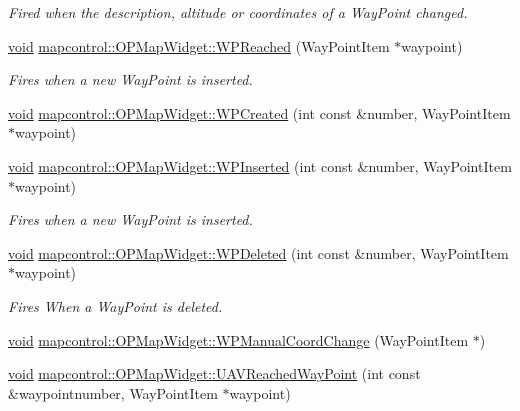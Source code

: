 \begin{DoxyCompactItemize}
\begin{DoxyCompactList}\small\item\em \-Fired when the description, altitude or coordinates of a \-Way\-Point changed. \end{DoxyCompactList}\item 
\hyperlink{group___u_a_v_objects_plugin_ga444cf2ff3f0ecbe028adce838d373f5c}{void} \hyperlink{group___o_p_map_widget_gace0e66a97e422c30b79aed508d0be81d}{mapcontrol\-::\-O\-P\-Map\-Widget\-::\-W\-P\-Reached} (\-Way\-Point\-Item $\ast$waypoint)
\begin{DoxyCompactList}\small\item\em \-Fires when a new \-Way\-Point is inserted. \end{DoxyCompactList}\item 
\hyperlink{group___u_a_v_objects_plugin_ga444cf2ff3f0ecbe028adce838d373f5c}{void} \hyperlink{group___o_p_map_widget_ga76a7138d7fd9e231e80d00430c349d03}{mapcontrol\-::\-O\-P\-Map\-Widget\-::\-W\-P\-Created} (int const \&number, \-Way\-Point\-Item $\ast$waypoint)
\item 
\hyperlink{group___u_a_v_objects_plugin_ga444cf2ff3f0ecbe028adce838d373f5c}{void} \hyperlink{group___o_p_map_widget_gaacb4d7f71ed1c2874106d276563e1348}{mapcontrol\-::\-O\-P\-Map\-Widget\-::\-W\-P\-Inserted} (int const \&number, \-Way\-Point\-Item $\ast$waypoint)
\begin{DoxyCompactList}\small\item\em \-Fires when a new \-Way\-Point is inserted. \end{DoxyCompactList}\item 
\hyperlink{group___u_a_v_objects_plugin_ga444cf2ff3f0ecbe028adce838d373f5c}{void} \hyperlink{group___o_p_map_widget_ga27de44a330cf3ee63827db0c562f7bb8}{mapcontrol\-::\-O\-P\-Map\-Widget\-::\-W\-P\-Deleted} (int const \&number, \-Way\-Point\-Item $\ast$waypoint)
\begin{DoxyCompactList}\small\item\em \-Fires \-When a \-Way\-Point is deleted. \end{DoxyCompactList}\item 
\hyperlink{group___u_a_v_objects_plugin_ga444cf2ff3f0ecbe028adce838d373f5c}{void} \hyperlink{group___o_p_map_widget_gac6d662e318e008a70747a8d26b971a3a}{mapcontrol\-::\-O\-P\-Map\-Widget\-::\-W\-P\-Manual\-Coord\-Change} (\-Way\-Point\-Item $\ast$)
\item 
\hyperlink{group___u_a_v_objects_plugin_ga444cf2ff3f0ecbe028adce838d373f5c}{void} \hyperlink{group___o_p_map_widget_ga532ae30a356e865120c460f345a4ab65}{mapcontrol\-::\-O\-P\-Map\-Widget\-::\-U\-A\-V\-Reached\-Way\-Point} (int const \&waypointnumber, \-Way\-Point\-Item $\ast$waypoint)

\end{DoxyCompactItemize}
